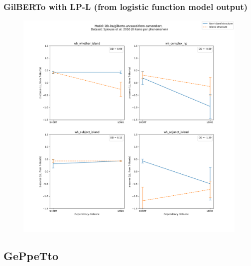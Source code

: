 \subsubsection{GilBERTo with LP-L (from logistic function model output)}
\begin{figure}[h]
	\centering
	\includegraphics[width=1\textwidth]{images/Chapter1/Sprouse_wh_idb-ita_gilberto-uncased-from-camembert_LL-zscores-likert-2022-07-11.png} 
\end{figure}

\clearpage
\subsection{GePpeTto}

